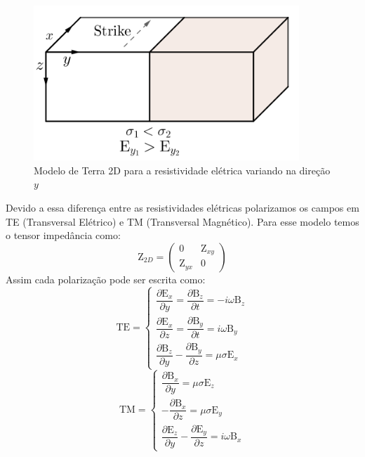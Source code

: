 	    \begin{figure}[H]
	        \caption{Modelo de Terra 2D para a resistividade elétrica variando na direção $y$}
	        \begin{center}
	        \includegraphics[width=10cm]{texto/fig/Tm_Te.png} 
	        \end{center}
		\label{fig_strike}
	    \end{figure}
	    Devido a essa diferença entre as resistividades elétricas polarizamos os campos em TE (Transversal Elétrico) e TM (Transversal Magnético).
	    Para esse modelo temos o tensor impedância como:
	    \begin{equation}
	     \textrm{Z}_{2D} = \left (\begin{array}{cc}
	                               0 & \textrm{Z}_{xy} \\
	                               \textrm{Z}_{yx} & 0
	                              \end{array} \right)
	    \end{equation}
	    Assim cada polarização pode ser escrita como:
	    \begin{equation}
	     \textrm{TE} = \left \{ \begin{array}{l}
	            \dfrac{\partial \textrm{E}_x}{\partial y} = \dfrac{\partial \textrm{B}_z}{\partial t} = -i\omega \textrm{B}_z \\[10pt]
	           \dfrac{\partial \textrm{E}_x}{\partial z} = \dfrac{\partial \textrm{B}_y}{\partial t} = i\omega \textrm{B}_y \\[10pt]
	           \dfrac{\partial \textrm{B}_z}{\partial y} - \dfrac{\partial \textrm{B}_y}{\partial z} = \mu \sigma \textrm{E}_x 
	           \end{array} \right.
	    \end{equation}
	    \begin{equation}
	     \textrm{TM} = \left \{ \begin{array}{l}
	            \dfrac{\partial \textrm{B}_x}{\partial y} = \mu \sigma \textrm{E}_z \\[10pt]
	           -\dfrac{\partial \textrm{B}_x}{\partial z} = \mu \sigma \textrm{E}_y \\[10pt]
	           \dfrac{\partial \textrm{E}_z}{\partial y} - \dfrac{\partial \textrm{E}_y}{\partial z} = i \omega \textrm{B}_x 
	           \end{array} \right.
	    \end{equation}
        

